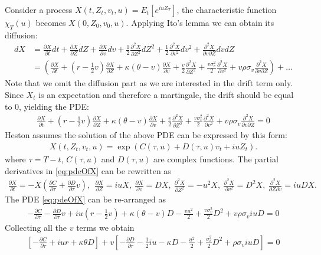 \documentclass[10pt,a4paper,hidelinks,fleqn]{article}            %
\newcommand{\pder}[2]{\frac{\partial#1}{\partial#2}}
\newcommand{\pderSnd}[2]{\frac{\partial^2#1}{\partial#2^2}}
\begin{document}
Consider a process $X(t, Z_t, v_t, u) = E_t[e^{iuZ_T}]$, the characteristic function $\chi_T(u)$ becomes $X(0, Z_0, v_0, u)$.
Applying Ito's lemma we can obtain its diffusion:
\begin{align}
dX & = \pder{X}{t} dt + \pder{X}{Z} dZ + \pder{X}{v} dv + \frac{1}{2} \pderSnd{X}{Z} dZ^2 + \frac{1}{2} \pderSnd{X}{v} dv^2 + \frac{\partial^2 X}{\partial v \partial Z} dv dZ \\
   & = \left(\pder{X}{t} + (r-\frac{1}{2}v) \pder{X}{Z} + \kappa (\theta - v) \pder{X}{v}
       + \frac{v}{2} \pderSnd{X}{Z} + \frac{v\sigma_v^2}{2} \pderSnd{X}{v} + v\rho \sigma_v \frac{\partial^2 X}{\partial v \partial Z}
       \right) + \ldots
\end{align}
Note that we omit the diffusion part as we are interested in the drift term only.
Since $X_t$ is an expectation and therefore a martingale, the drift should be equal to 0, yielding the PDE:
\begin{align}
\pder{X}{t} + (r-\frac{1}{2}v) \pder{X}{Z} + \kappa (\theta - v) \pder{X}{v}
       + \frac{v}{2} \pderSnd{X}{Z} + \frac{v\sigma_v^2}{2} \pderSnd{X}{v} + v\rho \sigma_v \frac{\partial^2 X}{\partial v \partial Z} = 0       
\label{eq:pdeOfX}
\end{align}
Heston assumes the solution of the above PDE can be expressed by this form:
\begin{align}
X(t, Z_t, v_t, u) = \exp(C(\tau, u) + D(\tau, u) v_t + iuZ_t).
\end{align}
where $\tau = T - t$, $C(\tau, u)$ and $D(\tau, u)$ are complex functions.
The partial derivatives in \eqref{eq:pdeOfX} can be rewritten as
\begin{align*}
\pder{X}{t} = -X\left(\pder{C}{\tau} + \pder{D}{\tau} v\right),~~
\pder{X}{Z} = iuX, ~
\pder{X}{v} = DX, ~
\pderSnd{X}{Z} = -u^2X, ~
\pderSnd{X}{v} = D^2 X, ~
\frac{\partial^2X}{\partial Z \partial v} = iuD X.
\end{align*}
The PDE \eqref{eq:pdeOfX} can be re-arranged as
\begin{align}
-\pder{C}{\tau} - \pder{D}{\tau} v + iu(r-\frac{1}{2}v) + \kappa(\theta - v)D 
- \frac{vu^2}{2} + \frac{v \sigma_v^2}{2} D^2 + v\rho \sigma_v iuD = 0
\end{align}
Collecting all the $v$ terms we obtain
\begin{align}
\left[ -\pder{C}{\tau} + iur + \kappa \theta D \right] + v
\left[
-\pder{D}{\tau} - \frac12iu - \kappa D - \frac{u^2}{2} + \frac{\sigma_v^2}{2}D^2 + \rho \sigma_v iuD
\right] = 0
\end{align}
\end{document}
